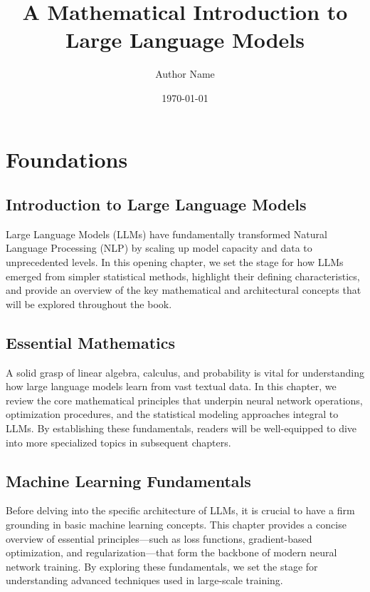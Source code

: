 \documentclass[12pt]{book}
\title{A Mathematical Introduction to Large Language Models}
\author{Author Name}
\date{\today}
\let\oldtableofcontents\tableofcontents
\renewcommand{\tableofcontents}{\oldtableofcontents\clearpage}
\begin{document}
\maketitle

\tableofcontents

\part{Foundations}

\chapter{Introduction to Large Language Models}
\noindent
Large Language Models (LLMs) have fundamentally transformed Natural Language Processing (NLP) by scaling up model capacity and data to unprecedented levels. In this opening chapter, we set the stage for how LLMs emerged from simpler statistical methods, highlight their defining characteristics, and provide an overview of the key mathematical and architectural concepts that will be explored throughout the book.





\chapter{Essential Mathematics}
\noindent
A solid grasp of linear algebra, calculus, and probability is vital for understanding how large language models learn from vast textual data. In this chapter, we review the core mathematical principles that underpin neural network operations, optimization procedures, and the statistical modeling approaches integral to LLMs. By establishing these fundamentals, readers will be well-equipped to dive into more specialized topics in subsequent chapters.






\chapter{Machine Learning Fundamentals}
\noindent
Before delving into the specific architecture of LLMs, it is crucial to have a firm grounding in basic machine learning concepts. This chapter provides a concise overview of essential principles—such as loss functions, gradient-based optimization, and regularization—that form the backbone of modern neural network training. By exploring these fundamentals, we set the stage for understanding advanced techniques used in large-scale training.
\end{document}
